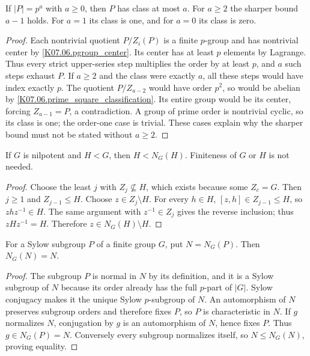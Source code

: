\begin{theorem}\label{thm:pgroup-nilpotent}
If $|P|=p^a$ with $a\geq0$, then $P$ has class at most $a$.
For $a\geq2$ the sharper bound $a-1$ holds. For $a=1$ its class is
one, and for $a=0$ its class is zero.
\end{theorem}
\begin{proof}
Each nontrivial quotient $P/Z_i(P)$ is a finite $p$-group and has
nontrivial center by \ref{K07.06.pgroup_center}. Its center has at least
$p$ elements by Lagrange. Thus every strict upper-series step multiplies
the order by at least $p$, and $a$ such steps exhaust $P$.
If $a\geq2$ and the class were exactly $a$, all these steps would have
index exactly $p$. The quotient $P/Z_{a-2}$ would have order $p^2$,
so would be abelian by \ref{K07.06.prime_square_classification}.
Its entire group would be its center, forcing $Z_{a-1}=P$, a
contradiction. A group of prime order is nontrivial cyclic, so its class
is one; the order-one case is trivial. These cases explain why the
sharper bound must not be stated without $a\geq2$.
\end{proof}

\begin{theorem}\label{thm:nilpotent-normalizer}
If $G$ is nilpotent and $H<G$, then $H<N_G(H)$. Finiteness of $G$
or $H$ is not needed.
\end{theorem}
\begin{proof}
Choose the least $j$ with $Z_j\nsubseteq H$, which exists because
some $Z_c=G$. Then $j\geq1$ and $Z_{j-1}\leq H$.
Choose $z\in Z_j\setminus H$. For every $h\in H$,
$[z,h]\in Z_{j-1}\leq H$, so $zhz^{-1}\in H$.
The same argument with $z^{-1}\in Z_j$ gives the reverse inclusion;
thus $zHz^{-1}=H$. Therefore $z\in N_G(H)\setminus H$.
\end{proof}

\begin{lemma}\label{lem:sylow-normalizer-self}
For a Sylow subgroup $P$ of a finite group $G$, put $N=N_G(P)$.
Then $N_G(N)=N$.
\end{lemma}
\begin{proof}
The subgroup $P$ is normal in $N$ by its definition, and it is a Sylow
subgroup of $N$ because its order already has the full $p$-part of
$|G|$. Sylow conjugacy makes it the unique Sylow $p$-subgroup of $N$.
An automorphism of $N$ preserves subgroup orders and therefore fixes
$P$, so $P$ is characteristic in $N$. If $g$ normalizes $N$,
conjugation by $g$ is an automorphism of $N$, hence fixes $P$.
Thus $g\in N_G(P)=N$. Conversely every subgroup normalizes itself,
so $N\leq N_G(N)$, proving equality.
\end{proof}

